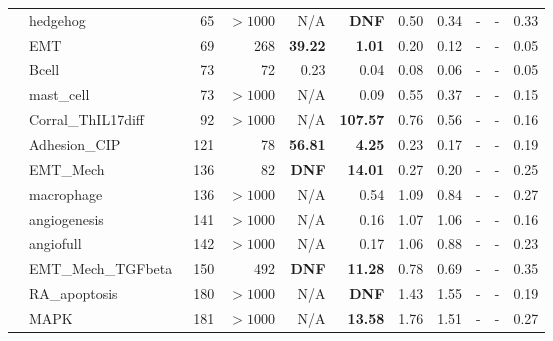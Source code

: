 \documentclass[preprint,12pt]{elsarticle}
\newcounter{rownumber}
\newcommand\rownb{\stepcounter{rownumber}\arabic{rownumber}}
\begin{document}
\begin{table}[!htb]
{\begin{tabular}{rlrrrrrrrrr}
    \rownb & hedgehog~\cite{DesignPrinciplesGeneNetworks} & 65 & $>1000$ & N/A & \textbf{DNF} & 0.50 & 0.34 & - & - & 0.33 \\
    \rownb & EMT~\cite{Rozum2021} & 69 & 268 & \textbf{39.22} & \textbf{1.01} & 0.20 & 0.12 & - & - & 0.05 \\
    \rownb & Bcell~\cite{Dutta2019} & 73 & 72 & 0.23 & 0.04 & 0.08 & 0.06 & - & - & 0.05 \\
    \rownb & mast\_cell~\cite{aghamiri2020automated} & 73 & $>1000$ & N/A & 0.09 & 0.55 & 0.37 & - & - & 0.15 \\
    \rownb & Corral\_ThIL17diff~\cite{corral2021interplay} & 92 & $>1000$ & N/A & \textbf{107.57} & 0.76 & 0.56 & - & - & 0.16 \\
    
    \midrule %
     \rownb & Adhesion\_CIP~\cite{guberman2020boolean} & 121 & 78 & \textbf{56.81} & \textbf{4.25} & 0.23 & 0.17 & - & - & 0.19 \\
    \rownb & EMT\_Mech~\cite{Sullivan2022} & 136 & 82 & \textbf{DNF} & \textbf{14.01} & 0.27 & 0.20 & - & - & 0.25 \\
    \rownb & macrophage~\cite{DesignPrinciplesGeneNetworks} & 136 & $>1000$ & N/A & 0.54 & 1.09 & 0.84 & - & - & 0.27 \\
    \rownb & angiogenesis~\cite{DesignPrinciplesGeneNetworks} & 141 & $>1000$ & N/A & 0.16 & 1.07 & 1.06 & - & - & 0.16 \\
    \rownb & angiofull~\cite{Weinstein2017} & 142 & $>1000$ & N/A & 0.17 & 1.06 & 0.88 & - & - & 0.23 \\
    \rownb & EMT\_Mech\_TGFbeta~\cite{Sullivan2022} & 150 & 492 & \textbf{DNF} & \textbf{11.28} & 0.78 & 0.69 & - & - & 0.35 \\
    \rownb & RA\_apoptosis~\cite{aghamiri2020automated} & 180 & $>1000$ & N/A & \textbf{DNF} & 1.43 & 1.55 & - & - & 0.19 \\
    \rownb & MAPK~\cite{aghamiri2020automated} & 181 & $>1000$ & N/A & \textbf{13.58} & 1.76 & 1.51 & - & - & 0.27 \\
    

\end{tabular}}
\end{table}
\end{document}
